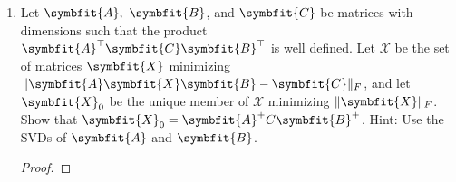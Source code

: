 \documentclass{article}
\theoremstyle{definition}
\newcommand{\mat}[1]{\symbfit{#1}}
\begin{document}
\begin{enumerate}[leftmargin=\labelsep]
\begin{proof}
{\begin{align*}
					                       & = \sum_{\substack{j=2\\j\neq i+1}}^n \abs{a_{j,i+1}} + \frac{\abs{\alpha_{1,i+1}}}{\abs{\alpha_{11}}} \sum_{\substack{j=2\\j\neq i+1}}^n \abs{\alpha_{j,1}}                                                                                                         \\
					                       & = \sum_{\substack{j=2\\j\neq i+1}}^n \qty(\abs{a_{j,i+1}} + \frac{\abs{\alpha_{1,i+1}}\abs{\alpha_{j,1}}}{\abs{\alpha_{11}}})                                                                                                                                       \\
					                       & \geq \sum_{\substack{j=2\\j\neq i+1}}^n \qty(a_{j,i+1} - \frac{\alpha_{1,i+1}\alpha_{j,1}}{\alpha_{11} })                                                                                                                                                           \\
					                       & \stackrel{\mathclap{\eqref{eq:bji}}}{=}  \sum_{\substack{j=1\\j\neq i}}^{n-1} \abs{\beta_{ji}}.                                                                                                                                                                     \\
				      \end{align*}}
		      Thus, \(\mat{B}\) is diagonally dominant. Then, by induction each iteration of Gaussian elimination on a diagonally dominant matrix produces a diagonally dominant submatrix, so no pivoting is required.
	      \end{proof}

	\item Let \(\mat{A},\ \mat{B}\), and \(\mat{C}\) be matrices with dimensions such that the product \(\mat{A}^\top\mat{C}\mat{B}^\top\) is well defined. Let \(\mathcal{X}\) be the set of matrices \(\mat{X}\) minimizing \(\|\mat{A}\mat{X} \mat{B} - \mat{C}\|_F\), and let \(\mat{X}_0\) be the unique member of \(\mathcal{X}\) minimizing \(\|\mat{X}\|_F\). Show that \(\mat{X}_0 = \mat{A}^+C\mat{B}^+\). Hint: Use the SVDs of \(\mat{A}\) and \(\mat{B}\).
	      \begin{proof}

	      \end{proof}


\end{enumerate}
\end{document}
